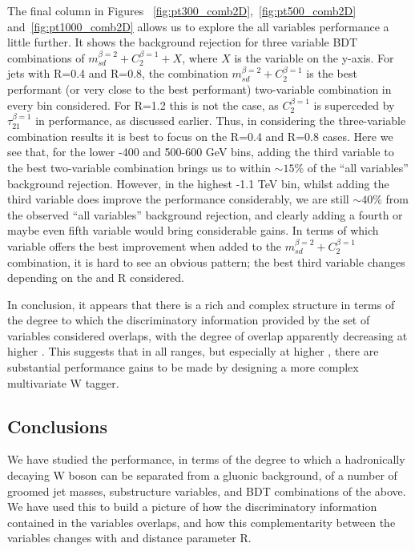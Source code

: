 The final column in Figures ~\ref{fig:pt300_comb2D},~\ref{fig:pt500_comb2D}
and~\ref{fig:pt1000_comb2D} allows us to explore the all variables
performance a little further. It shows the background rejection for 
three variable BDT combinations of $m_{sd}^{\beta=2} + C_2^{\beta=1} +
X$, where $X$ is the variable on the y-axis. For jets with R=0.4 and
R=0.8, the combination $m_{sd}^{\beta=2} + C_2^{\beta=1}$
is the best performant (or very close to the best performant)
two-variable combination in every \pt bin considered. For R=1.2 this
is not the case, as $C_2^{\beta=1}$ is superceded by
$\tau_{21}^{\beta=1}$ in performance, as discussed earlier. Thus, in
considering the three-variable combination results it is best to focus
on the R=0.4 and R=0.8 cases. Here we see that, for the lower -400 and 500-600 GeV bins, adding the third variable to the best
two-variable combination brings us to within $\sim 15\%$ of the ``all
variables'' background rejection. However, in the highest -1.1 TeV bin, whilst adding the third
variable does improve the performance considerably, we are still $\sim
40\%$ from the observed ``all variables'' background rejection, and
clearly adding a fourth or maybe even fifth variable would bring
considerable gains. In terms of which variable offers the best
improvement when added to the $m_{sd}^{\beta=2} + C_2^{\beta=1}$
combination, it is hard to see an obvious pattern; the best third
variable changes depending on the \pt and R considered.

In conclusion, it appears that there is a rich and
complex structure in terms of the degree to which the discriminatory
information provided by the set of variables considered overlaps, with
the degree of overlap apparently decreasing at higher \pt. This
suggests that in all \pt ranges, but especially at higher \pt, there
are substantial performance gains to be made by designing a more
complex multivariate W tagger.

\subsection{Conclusions}

We have studied the performance, in terms of the degree to which a
hadronically decaying W boson can be separated from a gluonic
background, of a number of groomed jet masses, substructure variables,
and BDT combinations of the above. We have used this to build a
picture of how the discriminatory information contained in the
variables overlaps, and how this complementarity between the variables
changes with \pt and \antikt distance parameter R. 

